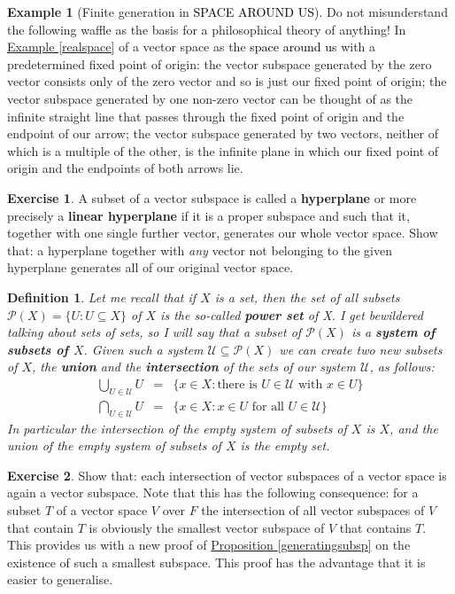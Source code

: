 \documentclass[11pt]{amsbook}
\newtheorem{definition}[theorem]{Definition}
\theoremstyle{definition}
\newtheorem{ex}[theorem]{Example}
\newtheorem{exercise}{Exercise}
\begin{document}
\begin{ex}[Finite generation in {\textcolor{black}{SPACE AROUND US}}]
 Do not misunderstand the following waffle as the basis for a philosophical theory of anything! In \hyperref[realspace]{Example \ref{realspace}} of a vector space as the {\textcolor{black}{space around us}} with a predetermined fixed point of origin: the vector subspace generated by the zero vector consists only of the zero vector and so is just our fixed point of origin; the vector subspace generated by one non-zero vector can be thought of as the infinite straight line that passes through the fixed point of origin and the endpoint of our arrow; the vector subspace generated by two vectors, neither of which is a multiple of the other, is the infinite plane in which our fixed point of origin and the endpoints of both arrows lie.
 \end{ex}

\begin{exercise} \label{hyperplane} A subset of a vector subspace is called a {\bf hyperplane} or more precisely a {\bf linear hyperplane} if it is a proper subspace and such that it, together with one single further vector, generates our whole vector space. Show that: a hyperplane together with {\it any} vector not belonging to the given hyperplane generates all of our original vector space.
\end{exercise}

\begin{definition}
Let me recall that if $X$ is a set, then the set of all subsets $\mathcal{P}(X) = \{ U : U\subseteq X\}$ of $X$ is the so-called {\bf power set} of X. I get bewildered talking about sets of sets, so I will say that a subset of $\mathcal{P}(X)$ is a {\bf system of subsets of $X$}.  Given such a system $\mathcal{U}\subseteq \mathcal{P}(X)$ we can create two new subsets of $X$, the {\bf union} and the  {\bf intersection} of the sets of our system $\mathcal{U}$, as follows:
\begin{eqnarray*}
\bigcup_{U\in \mathcal{U}} U &=& \{ x\in X: \text{there is $U\in \mathcal{U}$ with $x\in U$}\} \\
\bigcap_{U\in \mathcal{U}} U &=& \{ x\in X: \text{$x\in U$ for all $U\in \mathcal{U}$} \}
\end{eqnarray*}
In particular the intersection of the empty system of subsets of $X$ is $X$, and the union of the empty system of subsets of $X$ is the empty set.
\end{definition}

\begin{exercise} \label{intvssub} Show that: each intersection of vector subspaces of a vector space is again a vector subspace. Note that this has the following consequence: for a subset $T$ of a vector space $V$ over $F$ the intersection of all vector subspaces of $V$ that contain $T$ is obviously the smallest vector subspace of $V$ that contains $T$. This provides us with a new proof of \hyperref[generatingsubsp]{Proposition \ref{generatingsubsp}} on the existence of such a smallest subspace. This proof has the advantage that it is easier to generalise.
\end{exercise}
\end{document}
